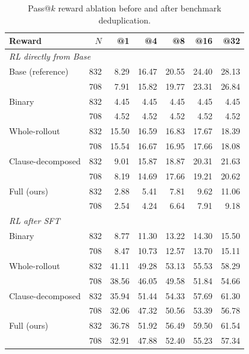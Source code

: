 \documentclass[10pt]{article}
\begin{document}
\begin{table}[H]
\centering
\begin{tabular}{lrrrrrr}
\toprule
\rowcolor{headerbg}
Reward & \(N\) & @1 & @4 & @8 & @16 & @32 \\
\midrule
\multicolumn{7}{l}{\textit{RL directly from Base}} \\
Base (reference)  & 832 & 8.29 & 16.47 & 20.55 & 24.40 & 28.13 \\
                  & 708 & 7.91 & 15.82 & 19.77 & 23.31 & 26.84 \\
\addlinespace
Binary            & 832 & 4.45 & 4.45 & 4.45 & 4.45 & 4.45 \\
                  & 708 & 4.52 & 4.52 & 4.52 & 4.52 & 4.52 \\
\addlinespace
Whole-rollout     & 832 & 15.50 & 16.59 & 16.83 & 17.67 & 18.39 \\
                  & 708 & 15.54 & 16.67 & 16.95 & 17.66 & 18.08 \\
\addlinespace
Clause-decomposed & 832 & 9.01 & 15.87 & 18.87 & 20.31 & 21.63 \\
                  & 708 & 8.19 & 14.69 & 17.66 & 19.21 & 20.62 \\
\addlinespace
Full (ours)       & 832 & 2.88 & 5.41 & 7.81 & 9.62 & 11.06 \\
                  & 708 & 2.54 & 4.24 & 6.64 & 7.91 & 9.18 \\
\midrule
\multicolumn{7}{l}{\textit{RL after SFT}} \\
Binary            & 832 & 8.77 & 11.30 & 13.22 & 14.30 & 15.50 \\
                  & 708 & 8.47 & 10.73 & 12.57 & 13.70 & 15.11 \\
\addlinespace
Whole-rollout     & 832 & 41.11 & 49.28 & 53.13 & 55.53 & 58.29 \\
                  & 708 & 38.56 & 46.05 & 49.58 & 51.84 & 54.66 \\
\addlinespace
Clause-decomposed & 832 & 35.94 & 51.44 & 54.33 & 57.69 & 61.30 \\
                  & 708 & 32.06 & 47.32 & 50.56 & 53.39 & 56.78 \\
\addlinespace
Full (ours)       & 832 & 36.78 & 51.92 & 56.49 & 59.50 & 61.54 \\
                  & 708 & 32.91 & 47.88 & 52.40 & 55.23 & 57.34 \\
\bottomrule
\end{tabular}
\caption{Pass@\(k\) reward ablation before and after benchmark deduplication.}
\label{tab:supp-reward-pass}
\end{table}
\end{document}
